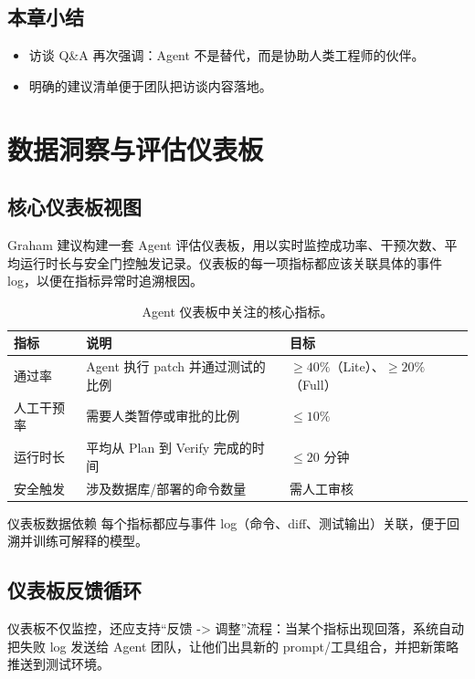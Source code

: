 \documentclass[a4paper]{article}
\begin{document}
\subsection{本章小结}
\begin{itemize}
    \item 访谈 Q\&A 再次强调：Agent 不是替代，而是协助人类工程师的伙伴。
    \item 明确的建议清单便于团队把访谈内容落地。
\end{itemize}

\section{数据洞察与评估仪表板}
\subsection{核心仪表板视图}
Graham 建议构建一套 Agent 评估仪表板，用以实时监控成功率、干预次数、平均运行时长与安全门控触发记录。仪表板的每一项指标都应该关联具体的事件 log，以便在指标异常时追溯根因。

\begin{table}[H]
\centering
\begin{tabular}{p{} p{} p{}}
\toprule
指标 & 说明 & 目标 \\
\midrule
通过率 & Agent 执行 patch 并通过测试的比例 & \(\geq 40\%\)（Lite）、\(\geq 20\%\)（Full） \\
\midrule
人工干预率 & 需要人类暂停或审批的比例 & \(\leq 10\%\) \\
\midrule
运行时长 & 平均从 Plan 到 Verify 完成的时间 & \(\leq 20 \text{ 分钟}\) \\
\midrule
安全触发 & 涉及数据库/部署的命令数量 & 需人工审核 \\
\bottomrule
\end{tabular}
\caption{Agent 仪表板中关注的核心指标。}
\end{table}

\begin{knowledgebox}{仪表板数据依赖}
每个指标都应与事件 log（命令、diff、测试输出）关联，便于回溯并训练可解释的模型。
\end{knowledgebox}

\subsection{仪表板反馈循环}
仪表板不仅监控，还应支持“反馈 -> 调整”流程：当某个指标出现回落，系统自动把失败 log 发送给 Agent 团队，让他们出具新的 prompt/工具组合，并把新策略推送到测试环境。
\end{document}
